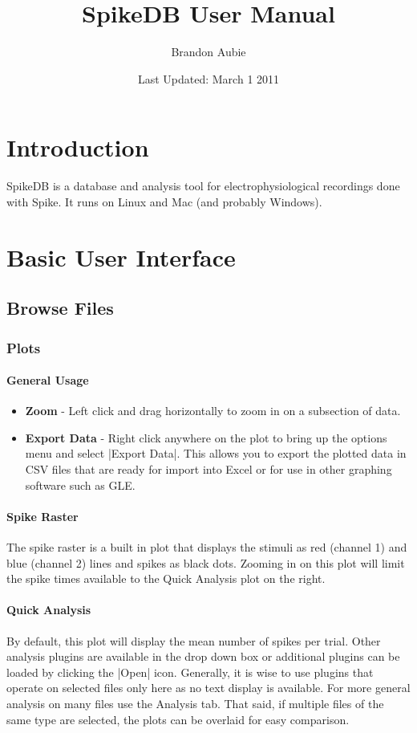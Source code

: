 \documentclass{report}
\title{SpikeDB User Manual}
\author{Brandon Aubie}
\date{Last Updated: March 1 2011}
\begin{document}

\maketitle
\tableofcontents 

\chapter{Introduction}
SpikeDB is a database and analysis tool for electrophysiological recordings done with Spike. It runs on Linux and Mac (and probably Windows).

\chapter{Basic User Interface}
\section{Browse Files}
\subsection{Plots}
\subsubsection{General Usage}
\begin{itemize}
	\item \textbf{Zoom} - Left click and drag horizontally to zoom in on a subsection of data.  
	\item \textbf{Export Data} - Right click anywhere on the plot to bring up the options menu and select |Export Data|. This allows you to export the plotted data in CSV files that are ready for import into Excel or for use in other graphing software such as GLE.
\end{itemize}

\subsubsection{Spike Raster}
The spike raster is a built in plot that displays the stimuli as red (channel 1) and blue (channel 2) lines and spikes as black dots. Zooming in on this plot will limit the spike times available to the Quick Analysis plot on the right.

\subsubsection{Quick Analysis}
By default, this plot will display the mean number of spikes per trial. Other analysis plugins are available in the drop down box or additional plugins can be loaded by clicking the |Open| icon. Generally, it is wise to use plugins that operate on selected files only here as no text display is available. For more general analysis on many files use the Analysis tab. That said, if multiple files of the same type are selected, the plots can be overlaid for easy comparison.
\end{document}
